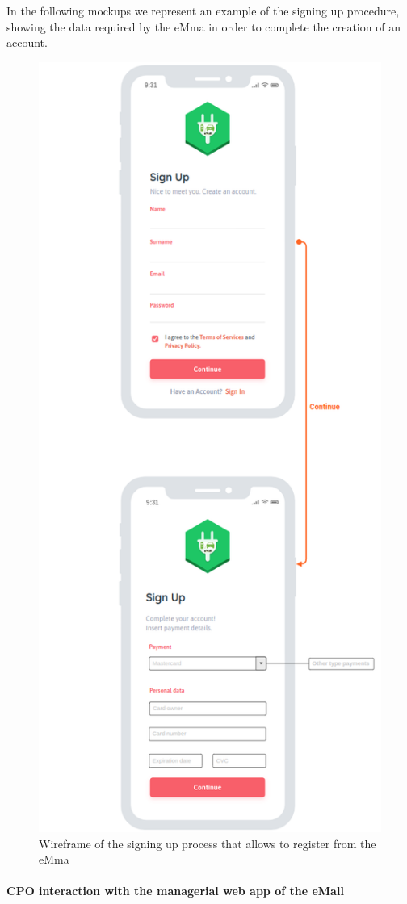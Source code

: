 In the following mockups we represent an example of the signing up procedure, showing the data required by the eMma in order to complete the creation of an account. 
\begin{figure}[H]
    \centering
    \includegraphics[scale=.45]{Images/cp3/signUp.png}
    \caption{Wireframe of the signing up process that allows to register from the eMma}
\end{figure}

\paragraph{CPO interaction with the managerial web app of the eMall}

